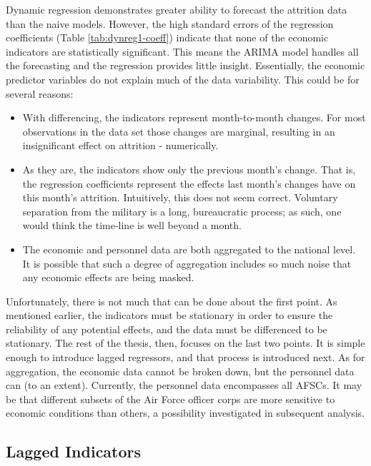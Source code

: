 \documentclass[12pt,letterpaper,toc=flat,oneside]{report}
\theoremstyle{definition}
\theoremstyle{definition}
\theoremstyle{definition}
\theoremstyle{remark}
\begin{document}
Dynamic regression demonstrates greater ability to forecast the
attrition data than the naive models. However, the high standard errors
of the regression coefficients (Table \ref{tab:dynreg1-coeff}) indicate
that none of the economic indicators are statistically significant. This
means the ARIMA model handles all the forecasting and the regression
provides little insight. Essentially, the economic predictor variables
do not explain much of the data variability. This could be for several
reasons:

\begin{itemize}
\item
  With differencing, the indicators represent month-to-month changes.
  For most observations in the data set those changes are marginal,
  resulting in an insignificant effect on attrition - numerically.
\item
  As they are, the indicators show only the previous month's change.
  That is, the regression coefficients represent the effects last
  month's changes have on this month's attrition. Intuitively, this does
  not seem correct. Voluntary separation from the military is a long,
  bureaucratic process; as such, one would think the time-line is well
  beyond a month.
\item
  The economic and personnel data are both aggregated to the national
  level. It is possible that such a degree of aggregation includes so
  much noise that any economic effects are being masked.
\end{itemize}

Unfortunately, there is not much that can be done about the first point.
As mentioned earlier, the indicators must be stationary in order to
ensure the reliability of any potential effects, and the data must be
differenced to be stationary. The rest of the thesis, then, focuses on
the last two points. It is simple enough to introduce lagged regressors,
and that process is introduced next. As for aggregation, the economic
data cannot be broken down, but the personnel data can (to an extent).
Currently, the personnel data encompasses all AFSCs. It may be that
different subsets of the Air Force officer corps are more sensitive to
economic conditions than others, a possibility investigated in
subsequent analysis.

\hypertarget{lagged-indicators}{%
\subsection{Lagged Indicators}\label{lagged-indicators}}
\end{document}
